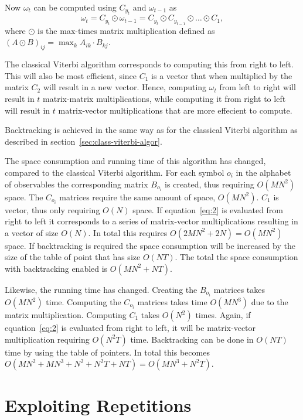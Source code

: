 Now $\omega_t$ can be computed using $C_{y_t}$ and $\omega_{t - 1}$ as
\begin{equation}
  \label{eq:2}
  \omega_t = C_{y_t} \odot \omega_{t - 1} = C_{y_t} \odot C_{y_{t-1}} \odot
  \dots \odot C_1,
\end{equation}
where $\odot$ is the max-times matrix multiplication defined as ${(A \odot
  B)}_{ij} = \max_k A_{ik} \cdot B_{kj}$.

The classical Viterbi algorithm corresponds to computing this from right to
left. This will also be most efficient, since $C_1$ is a vector that when
multiplied by the matrix $C_2$ will result in a new vector. Hence, computing
$\omega_t$ from left to right will result in $t$ matrix-matrix multiplications,
while computing it from right to left will result in $t$ matrix-vector
multiplications that are more effecient to compute.

Backtracking is achieved in the same way as for the classical Viterbi algorithm
as described in section~\ref{sec:class-viterbi-algor}.

The space consumption and running time of this algorithm has changed, compared
to the classical Viterbi algorithm. For each symbol $o_i$ in the alphabet of
observables the corresponding matrix $B_{o_i}$ is created, thus requiring
$O(M N^2)$ space. The $C_{o_i}$ matrices require the same amount of space,
$O(M N^2)$. $C_1$ is vector, thus only requiring $O(N)$ space. If
equation~\eqref{eq:2} is evaluated from right to left it corresponds to a
series of matrix-vector multiplications resulting in a vector of size
$O(N)$. In total this requires $O(2 M N^2 + 2 N) = O(M N^2)$ space. If
backtracking is required the space consumption will be increased by the size of
the table of point that has size $O(N T)$. The total the space consumption with
backtracking enabled is $O(M N^2 + N T)$.

Likewise, the running time has changed. Creating the $B_{o_i}$ matrices takes
$O(M N^2)$ time. Computing the $C_{o_i}$ matrices takes time $O(M N^3)$ due to
the matrix multiplication. Computing $C_1$ takes $O(N^2)$ times. Again, if
equation~\eqref{eq:2} is evaluated from right to left, it will be matrix-vector
multiplication requiring $O(N^2 T)$ time. Backtracking can be done in $O(NT)$
time by using the table of pointers. In total this becomes $O(M N^2 + M N^3 +
N^2 + N^2 T + NT) = O(M N^3 + N^2 T)$.

\section{Exploiting Repetitions}
\label{sec:expl-repet}


